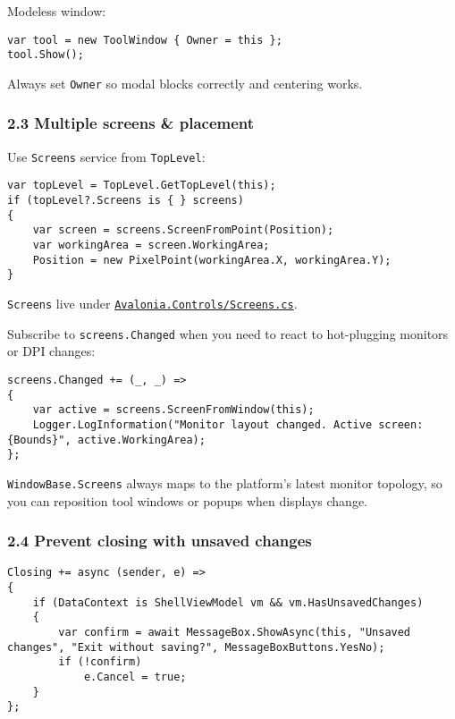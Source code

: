 Modeless window:

\begin{lstlisting}
var tool = new ToolWindow { Owner = this };
tool.Show();
\end{lstlisting}

Always set \passthrough{\lstinline!Owner!} so modal blocks correctly and
centering works.

\subsubsection{2.3 Multiple screens \&
placement}\label{multiple-screens-placement}

Use \passthrough{\lstinline!Screens!} service from
\passthrough{\lstinline!TopLevel!}:

\begin{lstlisting}
var topLevel = TopLevel.GetTopLevel(this);
if (topLevel?.Screens is { } screens)
{
    var screen = screens.ScreenFromPoint(Position);
    var workingArea = screen.WorkingArea;
    Position = new PixelPoint(workingArea.X, workingArea.Y);
}
\end{lstlisting}

\passthrough{\lstinline!Screens!} live under
\href{https://github.com/AvaloniaUI/Avalonia/blob/master/src/Avalonia.Controls/Screens.cs}{\passthrough{\lstinline!Avalonia.Controls/Screens.cs!}}.

Subscribe to \passthrough{\lstinline!screens.Changed!} when you need to
react to hot-plugging monitors or DPI changes:

\begin{lstlisting}
screens.Changed += (_, _) =>
{
    var active = screens.ScreenFromWindow(this);
    Logger.LogInformation("Monitor layout changed. Active screen: {Bounds}", active.WorkingArea);
};
\end{lstlisting}

\passthrough{\lstinline!WindowBase.Screens!} always maps to the
platform's latest monitor topology, so you can reposition tool windows
or popups when displays change.

\subsubsection{2.4 Prevent closing with unsaved
changes}\label{prevent-closing-with-unsaved-changes}

\begin{lstlisting}
Closing += async (sender, e) =>
{
    if (DataContext is ShellViewModel vm && vm.HasUnsavedChanges)
    {
        var confirm = await MessageBox.ShowAsync(this, "Unsaved changes", "Exit without saving?", MessageBoxButtons.YesNo);
        if (!confirm)
            e.Cancel = true;
    }
};
\end{lstlisting}

